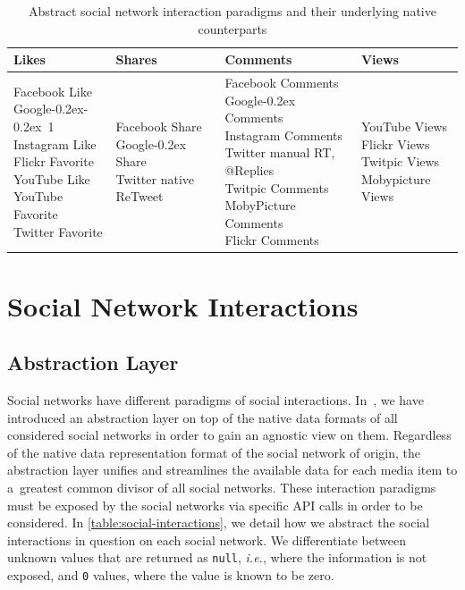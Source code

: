 \documentclass{sig-alternate}
\DeclareRobustCommand{\googleplus}{\mbox{Google\hspace{0em}\raisebox{.28ex}{\tiny\bf +}\kern-0.2ex}\xspace}
\DeclareRobustCommand{\plusone}{\mbox{\hspace{0em}\raisebox{.28ex}{\tiny\bf +}\kern-0.2ex 1}\xspace}
\begin{document}
\begin{table}[t!]
  \centering
  \begin{tabular}{|l|l|l|l|}
    \hline
    Likes & Shares & Comments & Views\\ \hline
    \pbox[t][2.5cm]{0.5\columnwidth}{Facebook Like\\ \googleplus \plusone\\ Instagram Like\\ Flickr Favorite\\ YouTube Like\\ YouTube Favorite\\ Twitter Favorite} & \pbox[t][2.5cm]{0.5\columnwidth}{Facebook Share\\ \googleplus Share\\ Twitter native ReTweet} & \pbox[t][2.5cm]{0.5\columnwidth}{Facebook Comments\\ \googleplus Comments\\ Instagram Comments\\ Twitter manual RT, @Replies\\ Twitpic Comments\\ MobyPicture Comments\\ Flickr Comments} & \pbox[t][2.5cm]{0.5\columnwidth}{YouTube Views\\ Flickr Views\\ Twitpic Views\\ Mobypicture Views}\\
      \hline
    \end{tabular}
    \caption{Abstract social network interaction paradigms
      and their underlying native counterparts}
  \label{table:social-interactions}
\end{table}

\section{Social Network Interactions}

\subsection{Abstraction Layer}
\label{sec:social-network-interactions}

Social networks have different paradigms of social interactions.
In~\cite{rizzo2012whatfresh}, we have introduced an
abstraction layer on top of the native data formats
of all considered social networks in order to gain
an agnostic view on them.
Regardless of the native data representation format
of the social network of origin, the abstraction layer unifies and streamlines
the available data for each media item
to a~greatest common divisor of all social networks.
These interaction paradigms must be exposed by the social networks 
via specific API calls in order to be considered.
In \autoref{table:social-interactions}, we detail
how we abstract the social interactions in question on each social network.
We differentiate between unknown values
that are returned as \texttt{null}, \emph{i.e.},
where the information is not exposed,
and \texttt{0} values, where the value is known to be zero.
\end{document}

